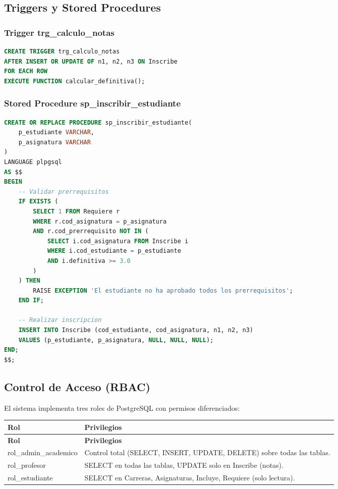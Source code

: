 \documentclass[12pt,a4paper]{article}
\begin{document}
\subsection{Triggers y Stored Procedures}

\subsubsection{Trigger trg\_calculo\_notas}

\begin{lstlisting}[language=SQL, caption=Trigger de calculo de notas definitivas]
CREATE TRIGGER trg_calculo_notas
AFTER INSERT OR UPDATE OF n1, n2, n3 ON Inscribe
FOR EACH ROW
EXECUTE FUNCTION calcular_definitiva();
\end{lstlisting}

\subsubsection{Stored Procedure sp\_inscribir\_estudiante}

\begin{lstlisting}[language=SQL, caption=Stored Procedure de validacion de inscripcion]
CREATE OR REPLACE PROCEDURE sp_inscribir_estudiante(
    p_estudiante VARCHAR,
    p_asignatura VARCHAR
)
LANGUAGE plpgsql
AS $$
BEGIN
    -- Validar prerrequisitos
    IF EXISTS (
        SELECT 1 FROM Requiere r
        WHERE r.cod_asignatura = p_asignatura
        AND r.cod_prerrequisito NOT IN (
            SELECT i.cod_asignatura FROM Inscribe i
            WHERE i.cod_estudiante = p_estudiante
            AND i.definitiva >= 3.0
        )
    ) THEN
        RAISE EXCEPTION 'El estudiante no ha aprobado todos los prerrequisitos';
    END IF;
    
    -- Realizar inscripcion
    INSERT INTO Inscribe (cod_estudiante, cod_asignatura, n1, n2, n3)
    VALUES (p_estudiante, p_asignatura, NULL, NULL, NULL);
END;
$$;
\end{lstlisting}

\subsection{Control de Acceso (RBAC)}

El sistema implementa tres roles de PostgreSQL con permisos diferenciados:

\begin{longtable}{|p{4cm}|p{10cm}|}
\hline
\rowcolor{udgreen!20}
\textbf{Rol} & \textbf{Privilegios} \\
\hline
\endfirsthead
\hline
\rowcolor{udgreen!20}
\textbf{Rol} & \textbf{Privilegios} \\
\hline
\endhead
rol\_admin\_academico & Control total (SELECT, INSERT, UPDATE, DELETE) sobre todas las tablas. \\
\hline
rol\_profesor & SELECT en todas las tablas, UPDATE solo en Inscribe (notas). \\
\hline
rol\_estudiante & SELECT en Carreras, Asignaturas, Incluye, Requiere (solo lectura). \\
\hline
\end{longtable}
\end{document}
